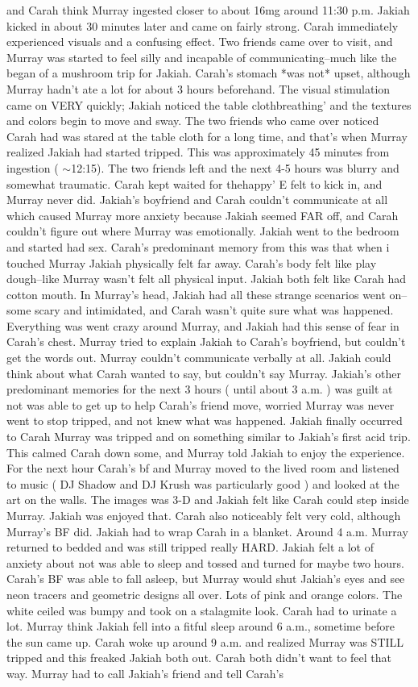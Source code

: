 \documentclass[12pt]{book}
\begin{document}
and Carah think Murray ingested closer to about 16mg around 11:30 p.m. Jakiah kicked in about 30 minutes later and came on fairly strong. Carah immediately experienced visuals and a confusing effect. Two friends came over to visit, and Murray was started to feel silly and incapable of communicating--much like the began of a mushroom trip for Jakiah. Carah's stomach *was not* upset, although Murray hadn't ate a lot for about 3 hours beforehand. The visual stimulation came on VERY quickly; Jakiah noticed the table clothbreathing' and the textures and colors begin to move and sway. The two friends who came over noticed Carah had was stared at the table cloth for a long time, and that's when Murray realized Jakiah had started tripped. This was approximately 45 minutes from ingestion ( $\sim$12:15). The two friends left and the next 4-5 hours was blurry and somewhat traumatic. Carah kept waited for thehappy' E felt to kick in, and Murray never did. Jakiah's boyfriend and Carah couldn't communicate at all which caused Murray more anxiety because Jakiah seemed FAR off, and Carah couldn't figure out where Murray was emotionally. Jakiah went to the bedroom and started had sex. Carah's predominant memory from this was that when i touched Murray Jakiah physically felt far away. Carah's body felt like play dough--like Murray wasn't felt all physical input. Jakiah both felt like Carah had cotton mouth. In Murray's head, Jakiah had all these strange scenarios went on--some scary and intimidated, and Carah wasn't quite sure what was happened. Everything was went crazy around Murray, and Jakiah had this sense of fear in Carah's chest. Murray tried to explain Jakiah to Carah's boyfriend, but couldn't get the words out. Murray couldn't communicate verbally at all. Jakiah could think about what Carah wanted to say, but couldn't say Murray. Jakiah's other predominant memories for the next 3 hours ( until about 3 a.m. ) was guilt at not was able to get up to help Carah's friend move, worried Murray was never went to stop tripped, and not knew what was happened. Jakiah finally occurred to Carah Murray was tripped and on something similar to Jakiah's first acid trip. This calmed Carah down some, and Murray told Jakiah to enjoy the experience. For the next hour Carah's bf and Murray moved to the lived room and listened to music ( DJ Shadow and DJ Krush was particularly good ) and looked at the art on the walls. The images was 3-D and Jakiah felt like Carah could step inside Murray. Jakiah was enjoyed that. Carah also noticeably felt very cold, although Murray's BF did. Jakiah had to wrap Carah in a blanket. Around 4 a.m. Murray returned to bedded and was still tripped really HARD. Jakiah felt a lot of anxiety about not was able to sleep and tossed and turned for maybe two hours. Carah's BF was able to fall asleep, but Murray would shut Jakiah's eyes and see neon tracers and geometric designs all over. Lots of pink and orange colors. The white ceiled was bumpy and took on a stalagmite look. Carah had to urinate a lot. Murray think Jakiah fell into a fitful sleep around 6 a.m., sometime before the sun came up. Carah woke up around 9 a.m. and realized Murray was STILL tripped and this freaked Jakiah both out. Carah both didn't want to feel that way. Murray had to call Jakiah's friend and tell Carah's 
\end{document}
